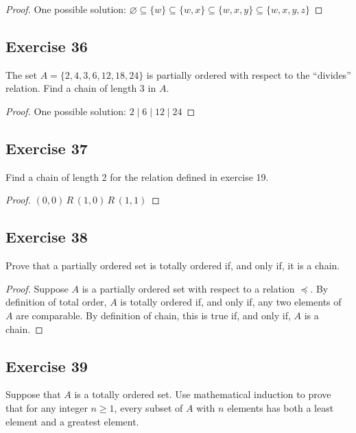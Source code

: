 \documentclass[14pt]{extarticle}
\newcommand{\es}{\varnothing}
\begin{document}
\begin{proof}
One possible solution: \(\es \subseteq \{w\} \subseteq \{w, x\} \subseteq \{w, x, y\} \subseteq \{w, x, y, z\}\)
\end{proof}

\subsection{Exercise 36}
The set \(A = \{2, 4, 3, 6, 12, 18, 24\}\) is partially ordered with respect to the “divides” relation. Find a 
chain of length 3 in \(A\).

\begin{proof}
One possible solution: \(2 \mid 6 \mid 12 \mid 24\)
\end{proof}

\subsection{Exercise 37}
Find a chain of length 2 for the relation defined in exercise 19.

\begin{proof}
\((0,0) \,R\, (1,0) \,R\, (1,1)\)
\end{proof}

\subsection{Exercise 38}
Prove that a partially ordered set is totally ordered if, and only if, it is a chain.

\begin{proof}
Suppose $A$ is a partially ordered set with respect to a relation \(\preceq\). By definition of total order, $A$ is 
totally ordered if, and only if, any two elements of $A$ are comparable. By definition of chain, this is true if, 
and only if, $A$ is a chain.
\end{proof}

\subsection{Exercise 39}
Suppose that $A$ is a totally ordered set. Use mathematical induction to prove that for any integer \(n \geq 1\), every 
subset of $A$ with $n$ elements has both a least element and a greatest element.
\end{document}
